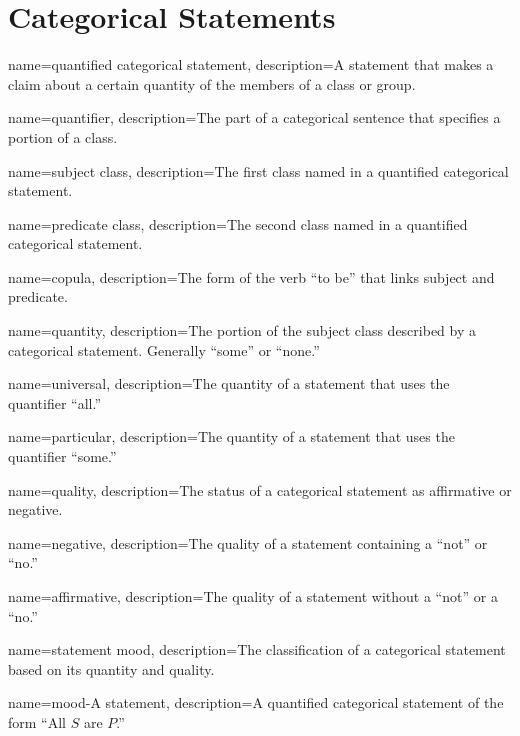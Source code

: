 \chapter{Categorical Statements}
\label{ch:catstatements}

{
  name=quantified categorical statement,
  description={A statement that makes a claim about a certain quantity of the members of a class or group.}
}

{
  name=quantifier,
  description={The part of a categorical sentence that specifies a portion of a class.}
}

{
  name=subject class,
  description={The first class named in a quantified categorical statement.}
}

{
  name=predicate class,
  description={The second class named in a quantified categorical statement.}
  }

{
  name=copula,
  description={The form of the verb ``to be'' that links subject and predicate.}
}

{
name=quantity,
description={The portion of the subject class described by a categorical statement. Generally ``some'' or ``none.''}
}

{
name=universal,
description={The quantity of a statement that uses the quantifier ``all.''}
}

{
name=particular,
description={The quantity of a statement that uses the quantifier ``some.''}
}

{
name=quality,
description={The status of a categorical statement as affirmative or negative.}
}

{
name=negative,
description={The quality of a statement containing a ``not'' or ``no.''}
}

{
name=affirmative,
description={The quality of a statement without a ``not'' or a ``no.''}
}

{
name=statement mood,
description={The classification of a categorical statement based on its quantity and quality.}
}

{
name=mood-A statement,
description={A quantified categorical statement of the form ``All $S$ are $P$.''}
}

